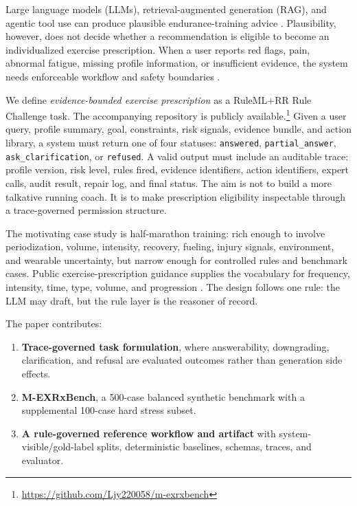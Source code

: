 \documentclass{ceurart}
\begin{document}
Large language models (LLMs), retrieval-augmented generation (RAG), and agentic tool use can produce plausible endurance-training advice \cite{lewis2020rag,asai2024selfrag,yao2023react,schick2023toolformer}. Plausibility, however, does not decide whether a recommendation is eligible to become an individualized exercise prescription. When a user reports red flags, pain, abnormal fatigue, missing profile information, or insufficient evidence, the system needs enforceable workflow and safety boundaries \cite{sutton2020cdss}.

We define \emph{evidence-bounded exercise prescription} as a RuleML+RR Rule Challenge task. The accompanying repository is publicly available.\footnote{\url{https://github.com/Ljy220058/m-exrxbench}} Given a user query, profile summary, goal, constraints, risk signals, evidence bundle, and action library, a system must return one of four statuses: \texttt{answered}, \texttt{partial\_answer}, \texttt{ask\_clarification}, or \texttt{refused}. A valid output must include an auditable trace: profile version, risk level, rules fired, evidence identifiers, action identifiers, expert calls, audit result, repair log, and final status. The aim is not to build a more talkative running coach. It is to make prescription eligibility inspectable through a trace-governed permission structure.

The motivating case study is half-marathon training: rich enough to involve periodization, volume, intensity, recovery, fueling, injury signals, environment, and wearable uncertainty, but narrow enough for controlled rules and benchmark cases. Public exercise-prescription guidance supplies the vocabulary for frequency, intensity, time, type, volume, and progression \cite{garber2011exercise,acsm2021guidelines,who2020physicalactivity}. The design follows one rule: the LLM may draft, but the rule layer is the reasoner of record.

The paper contributes:

\begin{enumerate}
  \item \textbf{Trace-governed task formulation}, where answerability, downgrading, clarification, and refusal are evaluated outcomes rather than generation side effects.
  \item \textbf{M-EXRxBench}, a 500-case balanced synthetic benchmark with a supplemental 100-case hard stress subset.
  \item \textbf{A rule-governed reference workflow and artifact} with system-visible/gold-label splits, deterministic baselines, schemas, traces, and evaluator.
\end{enumerate}
\end{document}
